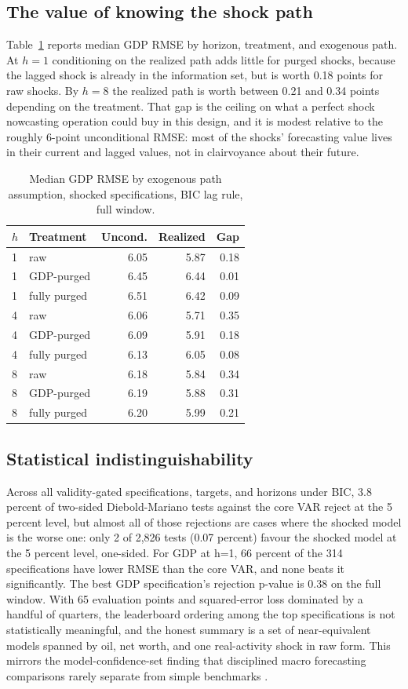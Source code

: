 \documentclass[conference]{IEEEtran}
\begin{document}
\subsection{The value of knowing the shock path}
Table~\ref{tab:path} reports median GDP RMSE by horizon, treatment, and exogenous path. At $h=1$ conditioning on the realized path adds little for purged shocks, because the lagged shock is already in the information set, but is worth 0.18 points for raw shocks. By $h=8$ the realized path is worth between 0.21 and 0.34 points depending on the treatment. That gap is the ceiling on what a perfect shock nowcasting operation could buy in this design, and it is modest relative to the roughly 6-point unconditional RMSE: most of the shocks' forecasting value lives in their current and lagged values, not in clairvoyance about their future.

\begin{table}[t]
\caption{Median GDP RMSE by exogenous path assumption, shocked specifications, BIC lag rule, full window.}
\label{tab:path}
\centering
\small
\begin{tabular}{@{}llrrr@{}}
\toprule
$h$ & Treatment & Uncond. & Realized & Gap \\
\midrule
1 & raw & 6.05 & 5.87 & 0.18 \\
1 & GDP-purged & 6.45 & 6.44 & 0.01 \\
1 & fully purged & 6.51 & 6.42 & 0.09 \\
4 & raw & 6.06 & 5.71 & 0.35 \\
4 & GDP-purged & 6.09 & 5.91 & 0.18 \\
4 & fully purged & 6.13 & 6.05 & 0.08 \\
8 & raw & 6.18 & 5.84 & 0.34 \\
8 & GDP-purged & 6.19 & 5.88 & 0.31 \\
8 & fully purged & 6.20 & 5.99 & 0.21 \\
\bottomrule
\end{tabular}
\end{table}

\subsection{Statistical indistinguishability}
Across all validity-gated specifications, targets, and horizons under BIC, 3.8 percent of two-sided Diebold-Mariano tests against the core VAR reject at the 5 percent level, but almost all of those rejections are cases where the shocked model is the worse one: only 2 of 2,826 tests (0.07 percent) favour the shocked model at the 5 percent level, one-sided. For GDP at h=1, 66 percent of the 314 specifications have lower RMSE than the core VAR, and none beats it significantly. The best GDP specification's rejection p-value is 0.38 on the full window. With 65 evaluation points and squared-error loss dominated by a handful of quarters, the leaderboard ordering among the top specifications is not statistically meaningful, and the honest summary is a set of near-equivalent models spanned by oil, net worth, and one real-activity shock in raw form. This mirrors the model-confidence-set finding that disciplined macro forecasting comparisons rarely separate from simple benchmarks \cite{hansen2011}.
\end{document}
